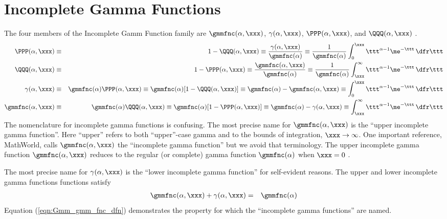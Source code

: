 \documentclass[12pt,twoside]{book}
\begin{document}
\section[Incomplete Gamma Functions]{Incomplete Gamma Functions}\label{sxn:gmm_inc}
The four members of the Incomplete Gamm Function family are
$\gmmfnc(\alpha,\xxx)$, $\gamma(\alpha,\xxx)$, $\PPP(\alpha,\xxx)$,
and $\QQQ(\alpha,\xxx)$ 
\cite[][p.~209]{AbS64,PTV96}.
\begin{eqnarray}
\PPP(\alpha,\xxx) & \equiv & 
1-\QQQ(\alpha,\xxx) \equiv \frac{\gamma(\alpha,\xxx)}{\gmmfnc(\alpha)} \equiv
\frac{1}{\gmmfnc(\alpha)} \int_{0}^{\xxx} 
\ttt^{\alpha - 1} \me^{-\ttt} \,\dfr\ttt \nonumber \\
\QQQ(\alpha,\xxx) & \equiv & 1-\PPP(\alpha,\xxx) \equiv
\frac{\gmmfnc(\alpha,\xxx)}{\gmmfnc(\alpha)} \equiv
\frac{1}{\gmmfnc(\alpha)} \int_{\xxx}^{\infty} 
\ttt^{\alpha - 1} \me^{-\ttt} \,\dfr\ttt \nonumber \\
\gamma(\alpha,\xxx) & \equiv & \gmmfnc(\alpha) \PPP(\alpha,\xxx) \equiv
\gmmfnc(\alpha) [1-\QQQ(\alpha,\xxx)] \equiv
\gmmfnc(\alpha) - \gmmfnc(\alpha,\xxx) \equiv
\int_{0}^{\xxx} \ttt^{\alpha - 1} \me^{-\ttt} \,\dfr\ttt \nonumber \\
\gmmfnc(\alpha,\xxx) & \equiv & \gmmfnc(\alpha) \QQQ(\alpha,\xxx) \equiv
\gmmfnc(\alpha) [1-\PPP(\alpha,\xxx)] \equiv 
\gmmfnc(\alpha) - \gamma(\alpha,\xxx) \equiv 
\int_{\xxx}^{\infty} \ttt^{\alpha - 1} \me^{-\ttt} \,\dfr\ttt \nonumber \\
\label{eqn:gmm_fnc_inc_dfn}
\end{eqnarray}
The nomenclature for incomplete gamma functions is confusing.
The most precise name for $\gmmfnc(\alpha,\xxx)$ is the
``upper incomplete gamma function''.
Here ``upper'' refers to both ``upper''-case gamma and to the bounds
of integration, $\xxx \rightarrow \infty$.
One important reference, MathWorld, calls $\gmmfnc(\alpha,\xxx)$ the
``incomplete gamma function'' but we avoid that terminology.
The upper incomplete gamma function $\gmmfnc(\alpha,\xxx)$ reduces to
the regular (or complete) gamma function $\gmmfnc(\alpha)$ when 
$\xxx = 0$ \cite[e.g.,][]{AbS64}.

The most precise name for $\gamma(\alpha,\xxx)$ is the
``lower incomplete gamma function'' for self-evident reasons.
The upper and lower incomplete gamma functions functions satisfy 
\begin{eqnarray}
\gmmfnc(\alpha,\xxx) + \gamma(\alpha,\xxx) & = & \gmmfnc(\alpha)
\label{eqn:Gmm_gmm_fnc_dfn}
\end{eqnarray}
Equation (\ref{eqn:Gmm_gmm_fnc_dfn}) demonstrates the property for
which the ``incomplete gamma functions'' are named.
\end{document}
